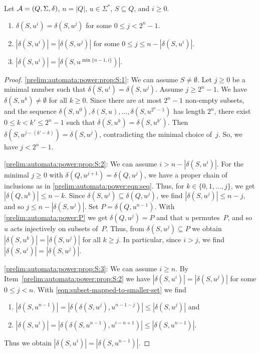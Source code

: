\begin{proposition} \label{prelim:word_in_PA} \label{prelim:automata:power:prop:S}  
Let $\mathcal A = (Q, \Sigma, \delta)$, $n = |Q|$, $u \in \Sigma^*$, $S \subseteq Q$, and $i \ge 0$.

\begin{enumerate}
\item \label{prelim:automata:power:prop:S:1} $\delta(S, u^i) = \delta(S, u^j)$ for some $0 \le j < 2^n - 1$.

\item \label{prelim:automata:power:prop:S:2} $|\delta(S, u^i)| = |\delta(S, u^j)|$ for some $0 \le j \le n - |\delta(S, u^i)|$. 

\item \label{prelim:automata:power:prop:S:3} $|\delta(S, u^i)| = |\delta(S, u^{\min\{n-1,i\}})|$. 
\end{enumerate}
\end{proposition}
\begin{proof}
\ref{prelim:automata:power:prop:S:1}: We can assume $S \ne \emptyset$.
 Let $j \ge 0$ be a minimal number
 such that $\delta(S, u^i) = \delta(S, u^j)$.
 Assume $j \ge 2^n - 1$.
 We have $\delta(S, u^k) \ne \emptyset$ for all $k \ge 0$. 
 Since there are at most $2^n - 1$ non-empty subsets, 
 and the sequence $\delta(S, u^0), \delta(S, u), \ldots, \delta(S, u^{2^n-1})$
 has length $2^n$, there exist $0 \le k < k' \le 2^n - 1$
 such that $\delta(S, u^{k}) = \delta(S, u^{k'})$.
 Then $\delta(S, u^{j - (k' - k)}) = \delta(S, u^j)$,
 contradicting the minimal choice of~$j$.
 So, we have $j < 2^n - 1$.

\ref{prelim:automata:power:prop:S:2}: We can assume $i > n - |\delta(S, u^i)|$.
 For the minimal $j \ge 0$ 
 with $\delta(Q, u^{j+1}) = \delta(Q, u^j)$, 
 we have a proper chain of inclusions as in \cref{prelim:automata:power:eqn:seq}.
 Thus, for $k \in \{0,1,\ldots,j\}$,
 we get $|\delta(Q, u^k)| \le n - k$.
 Since $\delta(S, u^j) \subseteq \delta(Q, u^j)$,
 we find $|\delta(S, u^j)| \le n - j$,
 and so $j \le n - |\delta(S, u^j)|$.
 Set $P = \delta(Q, u^{n-1})$.
 With \cref{prelim:automata:power:P} we get
 $\delta(Q, u^j) = P$ and that $u$ permutes~$P$,
 and so $u$ acts injectively on subsets of~$P$.
 Thus, from $\delta(S, u^j) \subseteq P$
 we obtain $|\delta(S, u^k)| = |\delta(S, u^j)|$
 for all $k \ge j$.
 In particular, since $i > j$,
 we find $|\delta(S, u^i)| = |\delta(S, u^j)|$.
  
 \ref{prelim:automata:power:prop:S:3}: We can assume $i \ge n$.
 	By Item~\ref{prelim:automata:power:prop:S:2} 
 	we have $|\delta(S, u^i)| = |\delta(S, u^j)|$
 	for some $0 \le j < n$.
 	With \cref{eqn:subset-mapped-to-smaller-set} 
 	we find
 	\begin{enumerate}
 	\item $
 	|\delta(S, u^{n-1})| = |\delta(\delta(S, u^j), u^{n - 1 - j})| \le |\delta(S, u^j)|
 	$
 	and
 	
 	\item $|\delta(S, u^i)| = |\delta(\delta(S, u^{n - 1}), u^{i - n + 1})| \le |\delta(S, u^{n - 1})|.
 	$
 	\end{enumerate}
 	Thus we obtain $|\delta(S, u^i)| = |\delta(S, u^{n-1})|$.
\end{proof}

